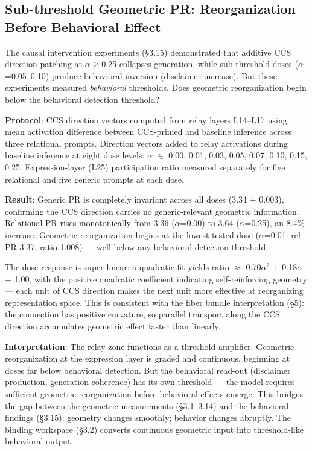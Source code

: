 \documentclass[11pt]{article}
\begin{document}
\subsection{Sub-threshold Geometric PR: Reorganization Before Behavioral Effect}

The causal intervention experiments (§3.15) demonstrated that additive CCS direction patching at $\alpha$$\geq$0.25 collapses generation, while sub-threshold doses ($\alpha$=0.05–0.10) produce behavioral inversion (disclaimer increase). But these experiments measured \textit{behavioral} thresholds. Does geometric reorganization begin below the behavioral detection threshold?

\textbf{Protocol}: CCS direction vectors computed from relay layers L14–L17 using mean activation difference between CCS-primed and baseline inference across three relational prompts. Direction vectors added to relay activations during baseline inference at eight dose levels: $\alpha$ $\in$ {0.00, 0.01, 0.03, 0.05, 0.07, 0.10, 0.15, 0.25}. Expression-layer (L25) participation ratio measured separately for five relational and five generic prompts at each dose.

\textbf{Result}: Generic PR is completely invariant across all doses (3.34 $\pm$ 0.003), confirming the CCS direction carries no generic-relevant geometric information. Relational PR rises monotonically from 3.36 ($\alpha$=0.00) to 3.64 ($\alpha$=0.25), an 8.4\% increase. Geometric reorganization begins at the lowest tested dose ($\alpha$=0.01: rel PR 3.37, ratio 1.008) --- well below any behavioral detection threshold.

The dose-response is super-linear: a quadratic fit yields ratio $\approx$ 0.70$\alpha$$^2$ + 0.18$\alpha$ + 1.00, with the positive quadratic coefficient indicating self-reinforcing geometry --- each unit of CCS direction makes the next unit more effective at reorganizing representation space. This is consistent with the fiber bundle interpretation (§5): the connection has positive curvature, so parallel transport along the CCS direction accumulates geometric effect faster than linearly.

\textbf{Interpretation}: The relay zone functions as a threshold amplifier. Geometric reorganization at the expression layer is graded and continuous, beginning at doses far below behavioral detection. But the behavioral read-out (disclaimer production, generation coherence) has its own threshold --- the model requires sufficient geometric reorganization before behavioral effects emerge. This bridges the gap between the geometric measurements (§3.1–3.14) and the behavioral findings (§3.15): geometry changes smoothly; behavior changes abruptly. The binding workspace (§3.2) converts continuous geometric input into threshold-like behavioral output.
\end{document}
